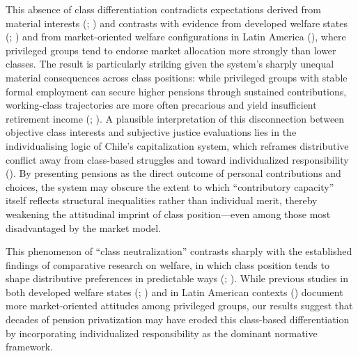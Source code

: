 \documentclass[
  12pt,
]{article}
\begin{document}
This absence of class differentiation contradicts expectations derived
from material interests (;
) and contrasts with
evidence from developed welfare states
(;
) and from market-oriented
welfare configurations in Latin America
(), where privileged
groups tend to endorse market allocation more strongly than lower
classes. The result is particularly striking given the system's sharply
unequal material consequences across class positions: while privileged
groups with stable formal employment can secure higher pensions through
sustained contributions, working-class trajectories are more often
precarious and yield insufficient retirement income
(;
). A
plausible interpretation of this disconnection between objective class
interests and subjective justice evaluations lies in the individualising
logic of Chile's capitalization system, which reframes distributive
conflict away from class-based struggles and toward individualized
responsibility (). By presenting pensions as the direct outcome of
personal contributions and choices, the system may obscure the extent to
which ``contributory capacity'' itself reflects structural inequalities
rather than individual merit, thereby weakening the attitudinal imprint
of class position---even among those most disadvantaged by the market
model.

This phenomenon of ``class neutralization'' contrasts sharply with the
established findings of comparative research on welfare, in which class
position tends to shape distributive preferences in predictable ways
(;
). While
previous studies in both developed welfare states
(;
) and in Latin American
contexts () document
more market-oriented attitudes among privileged groups, our results
suggest that decades of pension privatization may have eroded this
class-based differentiation by incorporating individualized
responsibility as the dominant normative framework.
\end{document}

